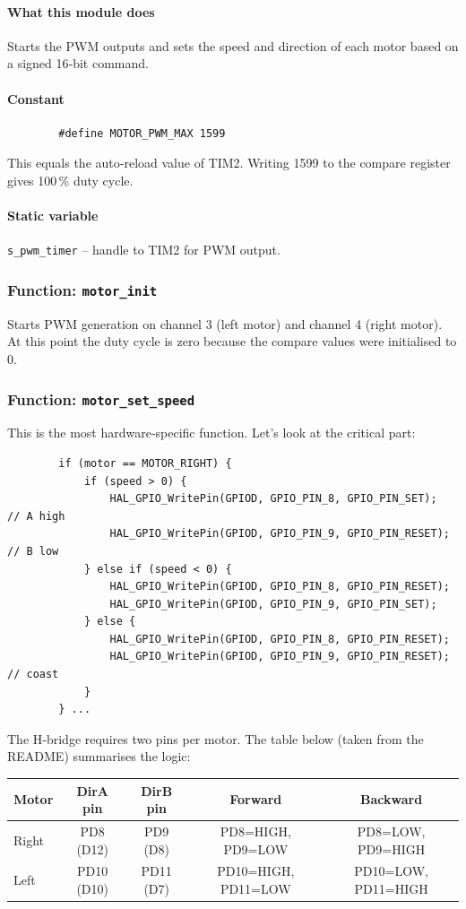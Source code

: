 \documentclass[12pt,a4paper]{article}
\newcommand{\func}[1]{\texttt{#1}}
\begin{document}
	\paragraph*{What this module does}
	Starts the PWM outputs and sets the speed and direction of each motor based on a signed 16‑bit command.
	
	\paragraph*{Constant}
	\begin{lstlisting}
		#define MOTOR_PWM_MAX 1599
	\end{lstlisting}
	This equals the auto‑reload value of TIM2. Writing 1599 to the compare register gives 100\,\% duty cycle.
	
	\paragraph*{Static variable}
	\texttt{s\_pwm\_timer} -- handle to TIM2 for PWM output.
	
	\subsubsection*{Function: \func{motor\_init}}
	Starts PWM generation on channel 3 (left motor) and channel 4 (right motor). At this point the duty cycle is zero because the compare values were initialised to 0.
	
	\subsubsection*{Function: \func{motor\_set\_speed}}
	This is the most hardware‑specific function. Let’s look at the critical part:
	\begin{lstlisting}
		if (motor == MOTOR_RIGHT) {
			if (speed > 0) {
				HAL_GPIO_WritePin(GPIOD, GPIO_PIN_8, GPIO_PIN_SET);   // A high
				HAL_GPIO_WritePin(GPIOD, GPIO_PIN_9, GPIO_PIN_RESET); // B low
			} else if (speed < 0) {
				HAL_GPIO_WritePin(GPIOD, GPIO_PIN_8, GPIO_PIN_RESET);
				HAL_GPIO_WritePin(GPIOD, GPIO_PIN_9, GPIO_PIN_SET);
			} else {
				HAL_GPIO_WritePin(GPIOD, GPIO_PIN_8, GPIO_PIN_RESET);
				HAL_GPIO_WritePin(GPIOD, GPIO_PIN_9, GPIO_PIN_RESET);  // coast
			}
		} ...
	\end{lstlisting}
	The H‑bridge requires two pins per motor. The table below (taken from the README) summarises the logic:
	
	\begin{table}[H]
		\centering
		\begin{tabular}{lcccc}
			\toprule
			\textbf{Motor} & \textbf{DirA pin} & \textbf{DirB pin} & \textbf{Forward} & \textbf{Backward} \\
			\midrule
			Right & PD8 (D12) & PD9 (D8)   & PD8=HIGH, PD9=LOW & PD8=LOW, PD9=HIGH \\
			Left  & PD10 (D10) & PD11 (D7) & PD10=HIGH, PD11=LOW & PD10=LOW, PD11=HIGH \\
			\bottomrule
		\end{tabular}
	\end{table}
	
\end{document}
